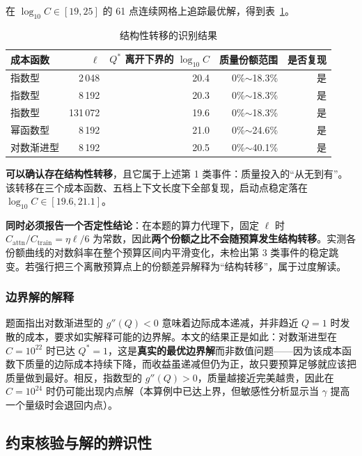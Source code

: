 在 $\log_{10}C\in[19,25]$ 的 61 点连续网格上追踪最优解，得到表~\ref{tab:q3_trans}。

\begin{table}[htbp]
\centering
\caption{结构性转移的识别结果}
\label{tab:q3_trans}
\small
\begin{tabular}{l|r|r|r|r}
\toprule
\textbf{成本函数} & \textbf{$\ell$} & \textbf{$Q^\ast$ 离开下界的 $\log_{10}C$} & \textbf{质量份额范围} & \textbf{是否复现} \\
\midrule
指数型 & 2\,048 & 20.4 & 0\%$\sim$18.3\% & 是 \\
指数型 & 8\,192 & 20.3 & 0\%$\sim$18.3\% & 是 \\
指数型 & 131\,072 & 19.6 & 0\%$\sim$18.3\% & 是 \\
幂函数型 & 8\,192 & 21.0 & 0\%$\sim$24.6\% & 是 \\
对数渐进型 & 8\,192 & 20.5 & 0\%$\sim$40.1\% & 是 \\
\bottomrule
\end{tabular}
\end{table}

\textbf{可以确认存在结构性转移}，且它属于上述第 1 类事件：质量投入的``从无到有''。该转移在三个成本函数、五档上下文长度下全部复现，启动点稳定落在 $\log_{10}C\in[19.6,21.1]$。

\textbf{同时必须报告一个否定性结论}：在本题的算力代理下，固定 $\ell$ 时
$C_{\mathrm{attn}}/C_{\mathrm{train}}=\eta\ell/6$ 为常数，因此\textbf{两个份额之比不会随预算发生结构转移}。实测各份额曲线的对数斜率在整个预算区间内平滑变化，未检出第 3 类事件的稳定跳变。若强行把三个离散预算点上的份额差异解释为``结构转移''，属于过度解读。

\subsubsection{边界解的解释}

题面指出对数渐进型的 $g''(Q)<0$ 意味着边际成本递减，并非趋近 $Q=1$ 时发散的成本，要求如实解释可能的边界解。本文的结果正是如此：对数渐进型在 $C=10^{22}$ 时已达 $Q^\ast=1$，这是\textbf{真实的最优边界解}而非数值问题——因为该成本函数下质量的边际成本持续下降，而收益虽递减但仍为正，故只要预算足够就应该把质量做到最好。相反，指数型的 $g''(Q)>0$，质量越接近完美越贵，因此在 $C=10^{24}$ 时仍可能出现内点解（本算例中已达上界，但敏感性分析显示当 $\gamma$ 提高一个量级时会退回内点）。

\subsection{约束核验与解的辨识性}
\label{sec:q3_check}

